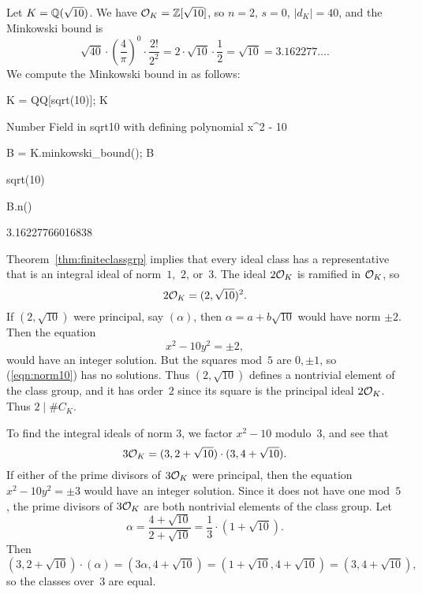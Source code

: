 \begin{example}
Let $K=\mathbb{Q}(\sqrt{10})$. We have $\mathcal{O}_K = \mathbb{Z}[\sqrt{10}]$,
so $n=2$, $s=0$, $|d_K| = 40$, and the Minkowski bound is
$$
	\sqrt{40}\cdot \left(\frac{4}{\pi}\right)^0 \cdot \frac{2!}{2^2}
	= 2\cdot \sqrt{10} \cdot \frac{1}{2} = \sqrt{10} = 3.162277\ldots.
$$
We compute the Minkowski bound in \sage as follows:
\begin{sagecode}
\begin{sagecell}
K = QQ[sqrt(10)]; K
\end{sagecell}
\begin{sageout}
Number Field in sqrt10 with defining polynomial x^2 - 10
\end{sageout}
\begin{sagecell}
B = K.minkowski_bound(); B
\end{sagecell}
\begin{sageout}
sqrt(10)
\end{sageout}
\begin{sagecell}
B.n()
\end{sagecell}
\begin{sageout}
3.16227766016838
\end{sageout}
\end{sagecode}
Theorem~\ref{thm:finiteclassgrp} implies that every ideal class has a
representative that is an integral ideal of norm~$1$,~$2$, or~$3$.
The ideal $2\mathcal{O}_K$ is ramified in $\mathcal{O}_K$, so
$$
	2\mathcal{O}_K = (2,\sqrt{10})^2.
$$
If $(2,\sqrt{10})$ were principal, say $(\alpha)$, then
$\alpha=a+b\sqrt{10}$ would have norm $\pm 2$.
Then the equation
\begin{equation}\label{eqn:norm10}
	x^2 - 10y^2 = \pm 2,
\end{equation}
would have an integer solution.  But the squares mod~$5$ are
$0,\pm 1$, so (\ref{eqn:norm10}) has no solutions.
Thus $(2,\sqrt{10})$ defines a nontrivial element of the class group,
and it has order~$2$ since its square is the principal ideal $2\mathcal{O}_K$.
Thus $2\mid \#C_K$.

To find the integral ideals of norm $3$, we
factor $x^2-10$ modulo~$3$, and see that
$$
	3\mathcal{O}_K  = (3,2+\sqrt{10}) \cdot (3,4+\sqrt{10}).
$$
If either of the prime divisors of $3\mathcal{O}_K$ were principal,
then the equation $x^2-10y^2 = \pm 3$ would have an integer
solution.  Since it does not have one mod~$5$, the prime divisors
of $3\mathcal{O}_K$ are both nontrivial elements of the class
group. Let
$$
	\alpha = \frac{4+\sqrt{10}}{2+\sqrt{10}} = \frac{1}{3}\cdot (1+\sqrt{10}).
$$
Then
$$
	(3,2+\sqrt{10})\cdot (\alpha) =  (3\alpha, 4+\sqrt{10})
	=  (1+\sqrt{10}, 4+\sqrt{10})
	=  (3, 4+\sqrt{10}),
$$
so the classes over~$3$ are equal.


\end{example}
